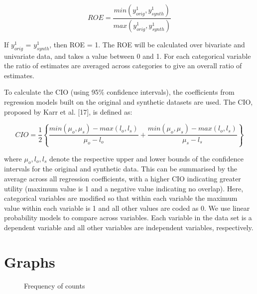 \documentclass[12pt]{article}
\begin{document}
\begin{equation}
    ROE = \frac{min(y^1_{orig},y^1_{synth})}{max(y^1_{orig},y^1_{synth})}
\end{equation}

If $y^1_{orig}$ = $y^1_{synth}$, then ROE = 1.  The ROE will be calculated over bivariate and univariate data, and takes a value between 0 and 1. For each categorical variable the ratio of estimates are averaged across categories to give an overall ratio of estimates.

To calculate the CIO (using 95\% confidence intervals), the coefficients from regression models built on the original and synthetic datasets are used. The CIO, proposed by Karr et al. [17], is defined as:

\begin{equation}
    CIO = \frac{1}{2}\left\{\frac{min(\mu_o,\mu_s)-max(l_o,l_s)}{\mu_o - l_o} + \frac{min(\mu_o,\mu_s)-max(l_o,l_s)}{\mu_s - l_s}\right\}
\end{equation}

where $\mu_o, l_o, l_s$ denote the respective upper and lower bounds of the confidence intervals for the original and synthetic data. This can be summarised by the average across all regression coefficients, with a higher CIO indicating greater utility (maximum value is 1 and a negative value indicating no overlap).  Here, categorical variables are modified so that within each variable the maximum value within each variable is 1 and all other values are coded as 0.  We use linear probability models to compare across variables.  Each variable in the data set is a dependent variable and all other variables are independent variables, respectively.

\clearpage
\section{Graphs}

\begin{figure}[!h]
    \centering
    \caption{Frequency of counts}
    \label{graph_synthpop_frequency}
\end{figure}
\end{document}
